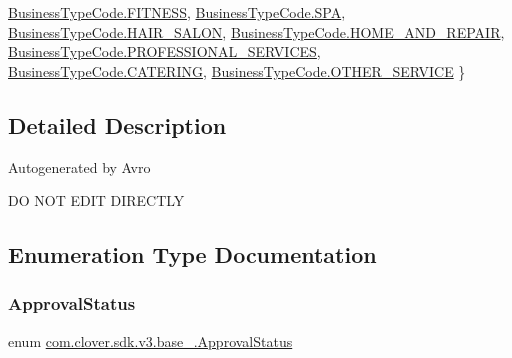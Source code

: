\begin{DoxyCompactItemize}
\hyperlink{namespacecom_1_1clover_1_1sdk_1_1v3_1_1base___a650568214ff50530b67b37a45a6b04e2a02bcd50b4a0f4d9bfa4822e23371656c}{Business\+Type\+Code.\+F\+I\+T\+N\+E\+SS}, 
\hyperlink{namespacecom_1_1clover_1_1sdk_1_1v3_1_1base___a650568214ff50530b67b37a45a6b04e2aaa491df98d63f0894f18087bb142d472}{Business\+Type\+Code.\+S\+PA}, 
\newline
\hyperlink{namespacecom_1_1clover_1_1sdk_1_1v3_1_1base___a650568214ff50530b67b37a45a6b04e2a36500f04b5602cb669e9c4d9817637c5}{Business\+Type\+Code.\+H\+A\+I\+R\+\_\+\+S\+A\+L\+ON}, 
\hyperlink{namespacecom_1_1clover_1_1sdk_1_1v3_1_1base___a650568214ff50530b67b37a45a6b04e2a09b87ef333fa3e40bad50485f7b1b1b9}{Business\+Type\+Code.\+H\+O\+M\+E\+\_\+\+A\+N\+D\+\_\+\+R\+E\+P\+A\+IR}, 
\hyperlink{namespacecom_1_1clover_1_1sdk_1_1v3_1_1base___a650568214ff50530b67b37a45a6b04e2a1f60a9b6acd5d50cc2cb00c132716fe4}{Business\+Type\+Code.\+P\+R\+O\+F\+E\+S\+S\+I\+O\+N\+A\+L\+\_\+\+S\+E\+R\+V\+I\+C\+ES}, 
\hyperlink{namespacecom_1_1clover_1_1sdk_1_1v3_1_1base___a650568214ff50530b67b37a45a6b04e2a42551369036d56571af769fa01bc2820}{Business\+Type\+Code.\+C\+A\+T\+E\+R\+I\+NG}, 
\newline
\hyperlink{namespacecom_1_1clover_1_1sdk_1_1v3_1_1base___a650568214ff50530b67b37a45a6b04e2a5fdbe62378885ec4a5f70b7e884f1bd2}{Business\+Type\+Code.\+O\+T\+H\+E\+R\+\_\+\+S\+E\+R\+V\+I\+CE}
 \}
\end{DoxyCompactItemize}


\subsection{Detailed Description}
Autogenerated by Avro

DO N\+OT E\+D\+IT D\+I\+R\+E\+C\+T\+LY 

\subsection{Enumeration Type Documentation}
\mbox{\label{namespacecom_1_1clover_1_1sdk_1_1v3_1_1base___af5c362e084bbe6d747115b0e234f9fb9}} 
\subsubsection{\texorpdfstring{Approval\+Status}{ApprovalStatus}}
{\footnotesize\ttfamily enum \hyperlink{namespacecom_1_1clover_1_1sdk_1_1v3_1_1base___af5c362e084bbe6d747115b0e234f9fb9}{com.\+clover.\+sdk.\+v3.\+base\+\_\+.\+Approval\+Status}\hspace{0.3cm}{\ttfamily [strong]}}

